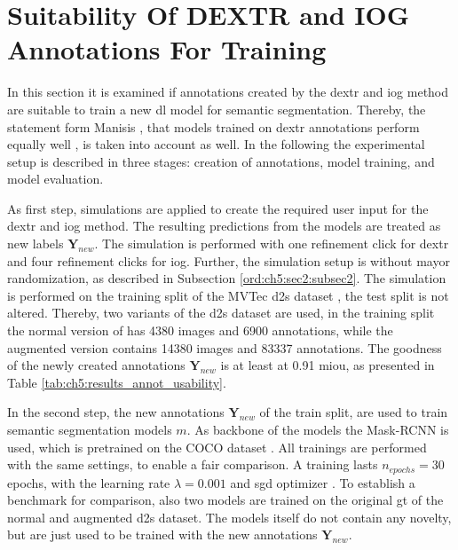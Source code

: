 
\section{Suitability Of DEXTR and IOG Annotations For Training} \label{ord:ch5:sec5_retrain}
In this section it is examined if annotations created by the \gls{dextr} and \gls{iog} method are suitable to train a new \gls{dl} model for semantic segmentation.
Thereby, the statement form Manisis \etal, that models trained on \gls{dextr} annotations perform equally well \cite{Man18-DEXTR}, is taken into account as well.
In the following the experimental setup is described in three stages: creation of annotations, model training, and model evaluation.
 
As first step, simulations are applied to create the required user input for the \gls{dextr} and \gls{iog} method.
The resulting predictions from the models are treated as new labels $ \textbf{Y}_{new} $. 
The simulation is performed with one refinement click for \gls{dextr} and four refinement clicks for \gls{iog}.
Further, the simulation setup is without mayor randomization, as described in Subsection \ref{ord:ch5:sec2:subsec2}.
The simulation is performed on the training split of the MVTec \gls{d2s} dataset \cite{Paddo18-D2S}, the test split is not altered.
Thereby, two variants of the \gls{d2s} dataset are used, in the training split the normal version of has 4380 images and 6900 annotations, while the augmented version contains 14380 images and 83337 annotations.
The goodness of the newly created annotations $ \textbf{Y}_{new} $ is at least at 0.91 \gls{miou}, as presented in Table \ref{tab:ch5:results_annot_usability}.

In the second step, the new annotations $ \textbf{Y}_{new} $ of the train split, are used to train semantic segmentation models $ m $.
As backbone of the models the Mask-RCNN \cite{He17-MaskR-CNN} is used, which is pretrained on the COCO dataset \cite{Lin14-Coco}.
All trainings are performed with the same settings, to enable a fair comparison.
A training lasts $ n_{epochs} = 30 $ epochs, with the learning rate $ \lambda = 0.001 $ and \gls{sgd} optimizer \cite{Ruder16-SGD}.
To establish a benchmark for comparison, also two models are trained on the original \gls{gt} of the normal and augmented \gls{d2s} dataset.
The models itself do not contain any novelty, but are just used to be trained with the new annotations $ \textbf{Y}_{new} $.

